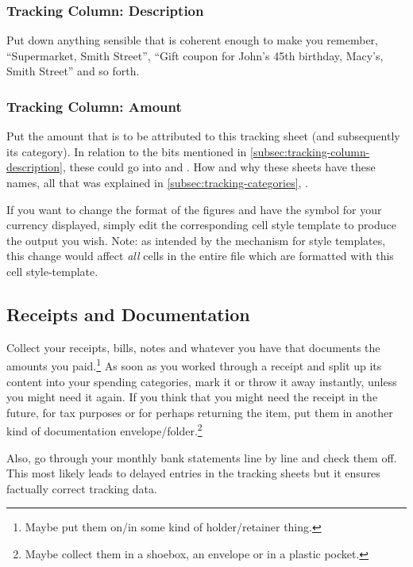 \subsubsection{Tracking Column: Description}
\label{subsec:tracking-column-description}

Put down anything sensible that is coherent enough to make you remember, \eg ``Supermarket, Smith Street'', ``Gift coupon for John's 45th birthday, Macy's, Smith Street'' and so forth.

\subsubsection{Tracking Column: Amount}
\label{subsec:tracking-column-amount}

Put the amount that is to be attributed to this tracking sheet (and subsequently its category).
In relation to the bits mentioned in \autoref{subsec:tracking-column-description}, these could go into  and .
How and why these sheets have these names, all that was explained in \autoref{subsec:tracking-categories}, .

If you want to change the format of the figures and have the symbol for your currency displayed, simply edit the corresponding cell style template to produce the output you wish.
Note: as intended by the mechanism for style templates, this change would affect \emph{all} cells in the entire file which are formatted with this cell style-template.

\subsection{Receipts and Documentation}
\label{subsec:tracking-receipts}

Collect your receipts, bills, notes and whatever you have that documents the amounts you paid.\footnote{Maybe put them on/in some kind of holder/retainer thing.}
As soon as you worked through a receipt and split up its content into your spending categories, mark it or throw it away instantly, unless you might need it again.
If you think that you might need the receipt in the future, \eg for tax purposes or for perhaps returning the item, put them in another kind of documentation envelope/folder.\footnote{Maybe collect them in a shoebox, an envelope or in a plastic pocket.}

Also, go through your monthly bank statements line by line and check them off.
This most likely leads to delayed entries in the tracking sheets but it ensures factually correct tracking data.

